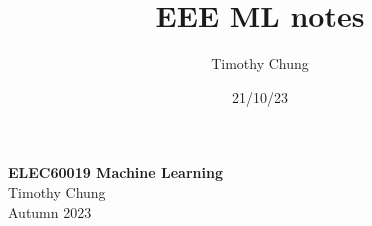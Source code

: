 \documentclass{report}
\title{EEE ML notes}
\author{Timothy Chung}
\date{21/10/23}
\begin{document}


\begin{titlepage}
    \centering
    \vspace*{1cm}
    \Huge
    \textbf{ELEC60019 Machine Learning} \\
    \vspace{1cm}
    \Large
    Timothy Chung \\
    \vspace{1cm}
    Autumn 2023 \\
    \vfill
\end{titlepage}

\setcounter{tocdepth}{1}
\tableofcontents
\newpage


% 







\end{document}
